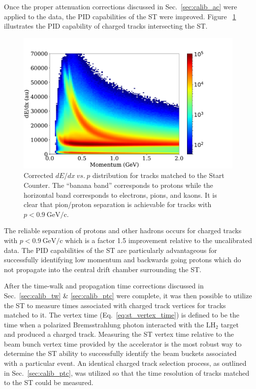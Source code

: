 Once the proper attenuation corrections discussed in Sec.~\ref{sec:calib_ac} were applied to the data, the PID capabilities of the ST were improved.  Figure ~\ref{fig:dEdx_vs_p_corr} illustrates the PID capability of charged tracks intersecting the ST.  
	\begin{figure}[!htb]
		\centering
		\includegraphics[width=1.0\columnwidth]{performance/figs/Att_corr}
		\caption{Corrected $dE/dx\ vs.\ p$ distribution for tracks matched to the Start Counter.  The ``banana band'' corresponds to protons while the horizontal band corresponds to electrons, pions, and kaons.  It is clear that pion/proton separation is achievable for tracks with $p < 0.9\ \mathrm{GeV/c}$.}
		\label{fig:dEdx_vs_p_corr}
	\end{figure}  
The reliable separation of protons and other hadrons occurs for charged tracks with $p < 0.9\ \mathrm{GeV/c}$ which is a factor 1.5 improvement relative to the uncalibrated data.  The PID capabilities of the ST are particularly advantageous for successfully identifying low momentum and backwards going protons which do not propagate into the central drift chamber surrounding the ST.

After the time-walk and propagation time corrections discussed in Sec.~\ref{sec:calib_tw} \& \ref{sec:calib_ptc} were complete, it was then possible to utilize the ST to measure times associated with charged track vertices for tracks matched to it.  The vertex time (Eq.~\ref{eq:st_vertex_time})  is defined to be the time when a polarized Bremsstrahlung photon interacted with the $\mathrm{LH_{2}}$ target and produced a charged track.  Measuring the ST vertex time relative to the beam bunch vertex time provided by the accelerator is the most robust way to determine the ST ability to successfully identify the beam buckets associated with a particular event.  An identical charged track selection process, as outlined in Sec.~\ref{sec:calib_ptc}, was utilized so that the time resolution of tracks matched to the ST could be measured.  

